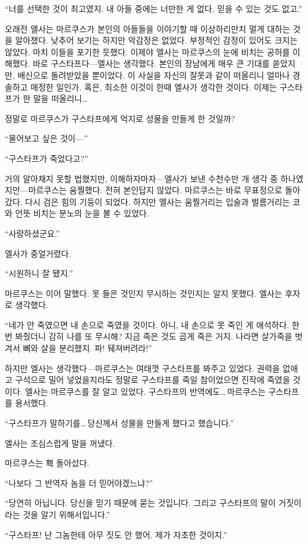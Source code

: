 ``너를 선택한 것이 최고였지. 내 아들 중에는 너만한 게 없다. 믿을 수 있는 것도 없고.''

오래전 엘사는 마르쿠스가 본인의 아들들을 이야기할 때 이상하리만치 멀게 대하는 것을 알아챘다. 낮추어 보기는 하지만 악감정은 없었다. 부정적인 감정이 있어도 크지는 않았다. 마치 이들을 포기한 듯했다. 이제야 엘사는 마르쿠스의 눈에 비치는 공허를 이해했다. 바로 구스타프다—엘사는 생각했다. 본인의 장남에게 매우 큰 기대를 쏟았지만, 배신으로 돌려받았을 뿐이었다. 이 사실을 자신의 잘못과 같이 떠올리니 얼마나 경솔하고 매정한 일인가. 혹은, 최소한 이것이 한때 엘사가 생각한 것이다. 이제는 구스타프가 한 말을 떠올리니\ldots

정말로 마르쿠스가 구스타프에게 억지로 성물을 만들게 한 것일까?

``물어보고 싶은 것이—''

``구스타프가 죽었다고?''

거의 알아채지 못할 법했지만, 이해하자마자—엘사가 보낸 수천수만 개 생각 중 하나였지만—마르쿠스는 움찔했다. 전혀 본인답지 않았다. 마르쿠스는 바로 무표정으로 돌아갔다. 다시 검은 힘의 기둥이 되었다. 하지만 엘사는 움찔거리는 입술과 벌름거리는 코와 언뜻 비치는 분노의 눈을 볼 수 있었다.

``사랑하셨군요.''

엘사가 중얼거렸다.

``시원하니 잘 됐지.''

마르쿠스는 이어 말했다. 못 들은 것인지 무시하는 것인지는 알지 못했다. 엘사는 후자로 생각했다.

``네가 안 죽였으면 내 손으로 죽였을 것이다. 아니, 내 손으로 못 죽인 게 애석하다. 한 번 봐줬더니 감히 나를 또 무시해? 지금 죽은 것도 곱게 죽은 거지. 나라면 살가죽을 벗겨서 뼈와 살을 분리했지. 파! 뒈져버려라!''

하지만 엘사는 생각했다—마르쿠스는 여태껏 구스타프를 봐주고 있었다. 권력을 없애고 구석으로 밀어 넣었을지라도 정말로 구스타프를 죽일 참이었으면 진작에 죽였을 것이다. 엘사는 마르쿠스를 잘 알고 있었다. 구스타프의 반역에도\ldots\,마르쿠스는 구스타프를 용서했다.

``구스타프가 말하기를\ldots\,당신께서 성물을 만들게 했다고 했습니다.''

엘사는 조심스럽게 말을 꺼냈다.

마르쿠스는 홱 돌아섰다.

``나보다 그 반역자 놈을 더 믿어야겠느냐?''

``당연히 아닙니다. 당신을 믿기 때문에 묻는 것입니다. 그리고 구스타프의 말이 거짓이라는 것을 알기 위해서입니다.''

``구스타프! 난 그놈한테 아무 짓도 안 했어. 제가 자초한 것이지.''

